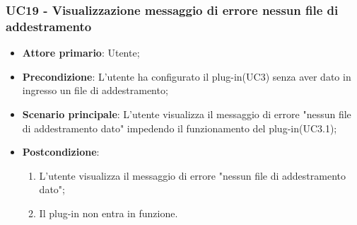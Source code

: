 \subsubsection{UC19 - Visualizzazione messaggio di errore nessun file di addestramento}
\label{sssec:uc19}
\begin{itemize}
  \item \textbf{Attore primario}: Utente;
  \item \textbf{Precondizione}: L'utente ha configurato il plug-in(UC3) senza aver dato in ingresso un file di addestramento;
  \item \textbf{Scenario principale}: L'utente visualizza il messaggio di errore "nessun file di addestramento dato" impedendo il funzionamento del plug-in(UC3.1);
  \item \textbf{Postcondizione}:
  \begin{enumerate}
		\item L'utente visualizza il messaggio di errore "nessun file di addestramento dato";
		\item Il plug-in non entra in funzione.
	\end{enumerate}
\end{itemize}
